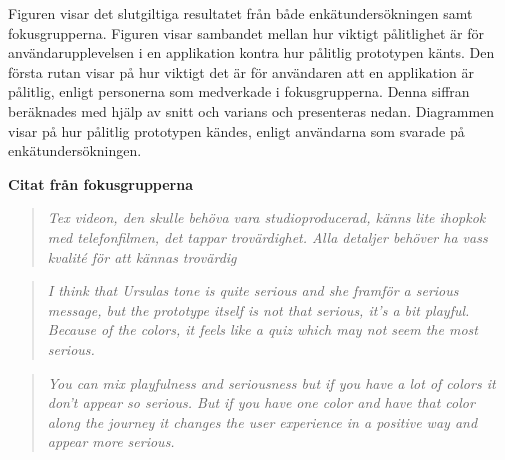 Figuren visar det slutgiltiga resultatet från både enkätundersökningen samt fokusgrupperna. Figuren visar sambandet mellan hur viktigt pålitlighet är för användarupplevelsen i en applikation kontra hur pålitlig prototypen känts. Den första rutan visar på hur viktigt det är för användaren att en applikation är pålitlig, enligt personerna som medverkade i fokusgrupperna. Denna siffran beräknades med hjälp av snitt och varians och presenteras nedan. Diagrammen visar på hur pålitlig prototypen kändes, enligt användarna som svarade på enkätundersökningen. 
    
\textbf{Citat från fokusgrupperna}
\begin{quotation}
\em Tex videon, den skulle behöva vara studioproducerad, känns lite ihopkok med telefonfilmen, det tappar trovärdighet. Alla detaljer behöver ha vass kvalité för att kännas trovärdig 
\end{quotation}

\begin{quotation}
\em I think that Ursulas tone is quite serious and she framför a serious message, but the prototype itself is not that serious, it’s a bit playful.  Because of the colors, it feels like a quiz which may not seem the most serious. 
\end{quotation}

\begin{quotation}
\em  You can mix playfulness and seriousness but if you have a lot of colors it don’t appear so serious.  But if you have one color and have that color along the journey it changes the user experience in a positive way and appear more serious. 
\end{quotation}




